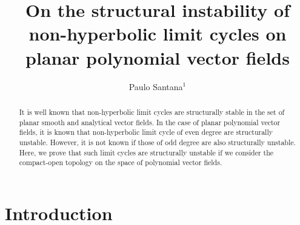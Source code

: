 \documentclass[11pt]{amsart}
\begin{document}
	
\title[Non-hyperbolic limit cycles on planar polynomial vector fields]{On the structural instability of non-hyperbolic limit cycles on planar polynomial vector fields}

\author[Paulo Santana]
{Paulo Santana$^1$}


\address{$^1$ IBILCE-UNESP, CEP 15054--000, S\~ao Jos\'e do Rio Preto, S\~ao Paulo, Brazil}



\begin{abstract}
	It is well known that non-hyperbolic limit cycles are structurally stable in the set of planar smooth and analytical vector fields. In the case of planar polynomial vector fields, it is known that non-hyperbolic limit cycle of even degree are structurally unstable. However, it is not known if those of odd degree are also structurally unstable. Here, we prove that such limit cycles are structurally unstable if we consider the compact-open topology on the space of polynomial vector fields.
\end{abstract}

\maketitle

\section{Introduction}
\end{document}
